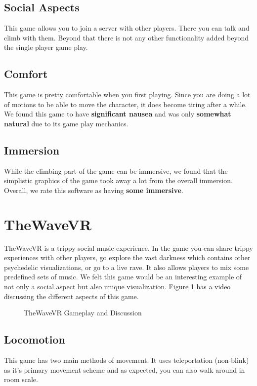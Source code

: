 \documentclass[journal]{IEEEtran}
\begin{document}
\subsection{Social Aspects}
This game allows you to join a server with other players. There you can talk and climb with them. Beyond that there is not any other functionality added beyond the single player game play. 
\subsection{Comfort}
This game is pretty comfortable when you first playing. Since you are doing a lot of motions to be able to move the character, it does become tiring after a while. We found this game to have \textbf{significant nausea} and was only \textbf{somewhat natural} due to its game play mechanics. 

\subsection{Immersion}
While the climbing part of the game can be immersive, we found that the simplistic graphics of the game took away a lot from the overall immersion.  Overall, we rate this software as having \textbf{some immersive}.

\section{TheWaveVR}
TheWaveVR is a trippy social music experience. In the game you can share trippy experiences with other players, go explore the vast darkness which contains other psychedelic visualizations, or go to a live rave. It also allows players to mix some predefined sets of music. We felt this game would be an interesting example of not only a social aspect but also unique visualization. Figure \ref{TheWaveVR_Gameplay} has a video discussing the different aspects of this game. 
\begin{figure}[h]
	\centering
		\caption{TheWaveVR Gameplay and Discussion}
		\label{TheWaveVR_Gameplay}
\end{figure}
\subsection{Locomotion}
This game has two main methods of movement. It uses teleportation (non-blink) as it's primary movement scheme and as expected, you can also walk around in room scale. 
\end{document}
